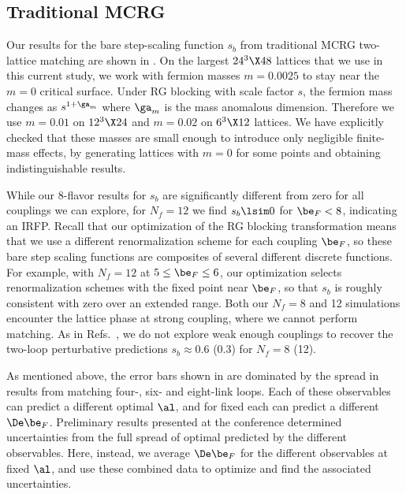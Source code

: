 \subsection{\label{sec:MCRGresults}Traditional MCRG} %
Our results for the bare step-scaling function $s_b$ from traditional MCRG two-lattice matching are shown in .
On the largest $24^3\X48$ lattices that we use in this current study, we work with fermion masses $m = 0.0025$ to stay near the $m = 0$ critical surface.
Under RG blocking with scale factor $s$, the fermion mass changes as $s^{1 + \ga_m}$ where $\ga_m$ is the mass anomalous dimension.
Therefore we use $m = 0.01$ on $12^3\X24$ and $m = 0.02$ on $6^3\X12$ lattices.
We have explicitly checked that these masses are small enough to introduce only negligible finite-mass effects, by generating lattices with $m = 0$ for some points and obtaining indistinguishable results.

While our 8-flavor results for $s_b$ are significantly different from zero for all couplings we can explore, for $N_f = 12$ we find $s_b \lsim 0$ for $\be_F < 8$, indicating an IRFP.
Recall that our optimization of the RG blocking transformation means that we use a different renormalization scheme for each coupling $\be_F$, so these bare step scaling functions are composites of several different discrete \be functions.
For example, with $N_f = 12$ at $5 \leq \be_F \leq 6$, our optimization selects renormalization schemes with the fixed point near $\be_F$, so that $s_b$ is roughly consistent with zero over an extended range.
Both our $N_f = 8$ and 12 simulations encounter the \Sb lattice phase at strong coupling, where we cannot perform matching.
As in Refs.~\cite{Hasenfratz:2011xn, Hasenfratz:2011np}, we do not explore weak enough couplings to recover the two-loop perturbative predictions $s_b \approx 0.6$ (0.3) for $N_f = 8$ (12).

As mentioned above, the error bars shown in  are dominated by the spread in results from matching four-, six- and eight-link loops.
Each of these observables can predict a different optimal $\al$, and for fixed \al each can predict a different $\De\be_F$.
Preliminary results presented at the conference determined uncertainties from the full spread of optimal \al predicted by the different observables.
Here, instead, we average $\De\be_F$ for the different observables at fixed $\al$, and use these combined data to optimize \al and find the associated uncertainties.

